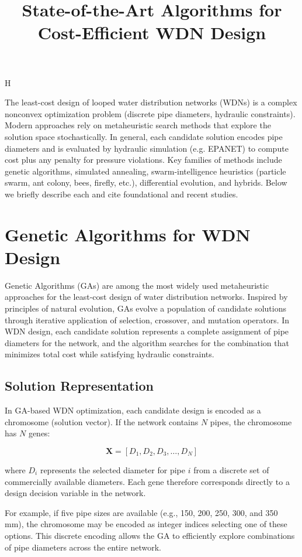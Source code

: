 H\documentclass[12pt, a4paper]{article}
\title{State-of-the-Art Algorithms for Cost-Efficient WDN Design}
\date{}
\author{}
\begin{document}
\maketitle

The least-cost design of looped water distribution networks (WDNs) is a complex nonconvex optimization problem (discrete pipe diameters, hydraulic constraints). Modern approaches rely on metaheuristic search methods that explore the solution space stochastically. In general, each candidate solution encodes pipe diameters and is evaluated by hydraulic simulation (e.g. EPANET) to compute cost plus any penalty for pressure violations. Key families of methods include genetic algorithms, simulated annealing, swarm-intelligence heuristics (particle swarm, ant colony, bees, firefly, etc.), differential evolution, and hybrids. Below we briefly describe each and cite foundational and recent studies.

\section*{Genetic Algorithms for WDN Design}

Genetic Algorithms (GAs) are among the most widely used metaheuristic approaches for the least-cost design of water distribution networks. Inspired by principles of natural evolution, GAs evolve a population of candidate solutions through iterative application of selection, crossover, and mutation operators. In WDN design, each candidate solution represents a complete assignment of pipe diameters for the network, and the algorithm searches for the combination that minimizes total cost while satisfying hydraulic constraints.

\subsection*{Solution Representation}

In GA-based WDN optimization, each candidate design is encoded as a chromosome (solution vector). If the network contains $N$ pipes, the chromosome has $N$ genes:

\[
\mathbf{X} = [D_1, D_2, D_3, \dots, D_N]
\]

where $D_i$ represents the selected diameter for pipe $i$ from a discrete set of commercially available diameters. Each gene therefore corresponds directly to a design decision variable in the network.

For example, if five pipe sizes are available (e.g., 150, 200, 250, 300, and 350 mm), the chromosome may be encoded as integer indices selecting one of these options. This discrete encoding allows the GA to efficiently explore combinations of pipe diameters across the entire network.
\end{document}
